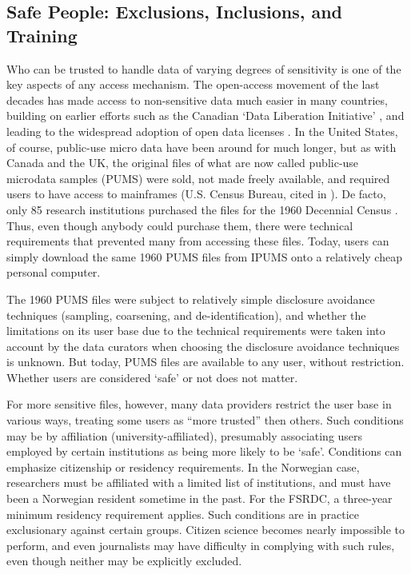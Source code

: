 \subsection{Safe People: Exclusions, Inclusions, and Training}

Who can be trusted to handle data of varying degrees of sensitivity is one of the key aspects of any access mechanism. The open-access movement of the last decades has made access to non-sensitive data much easier in many countries, building on earlier efforts such as the Canadian `Data Liberation Initiative' \cite{currie2015social}, and leading to the widespread adoption of open data licenses \cite{statistics_canada_statistics_2012,uk_government_open_2014}. In the United States, of course, public-use micro data have been around for much longer, but as with Canada and the UK, the original files of what are now called public-use microdata samples (PUMS) were sold, not made freely available, and required users to have access to mainframes (U.S. Census Bureau, cited in \cite{anderson_american_2015}). De facto, only 85 research institutions purchased the files for the 1960 Decennial Census \cite{anderson_american_2015}. Thus, even though anybody could purchase them, there were technical requirements that prevented many from accessing these files. Today,  users can simply download the same 1960 PUMS files from IPUMS \cite{ruggles_steven_ipums_2021} onto a relatively cheap personal computer.

The 1960 PUMS files were subject to relatively simple disclosure avoidance techniques (sampling, coarsening, and de-identification), and whether the limitations on its user base due to the technical requirements were taken into account by the data curators when choosing the disclosure avoidance techniques is unknown. But today, PUMS files are available to any user, without restriction. Whether users are considered `safe' or not does not matter. 

For more sensitive files, however, many data providers restrict the user base in various ways, treating some users as ``more trusted'' then others. Such conditions may be by affiliation (university-affiliated), presumably associating users employed  by certain institutions as being more likely to be `safe'. Conditions can emphasize citizenship or residency requirements. In the Norwegian case, researchers must be affiliated with a limited list of institutions, and must have been a Norwegian resident sometime in the past. For the FSRDC, a three-year minimum residency requirement applies. Such conditions are in practice exclusionary against certain groups. Citizen science becomes nearly impossible to perform, and even journalists may have difficulty in complying with such rules, even though neither may be explicitly excluded. 


